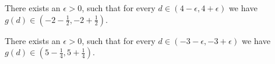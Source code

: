 \documentclass{ximera}
\begin{document}
\begin{exercise}
\begin{question}
\end{question}














\begin{question} 

There exists an $\epsilon > 0$, such that for every $d \in (4-\epsilon, 4+\epsilon)$ we have $g(d) \in \left( -2-\frac{1}{2}, -2+\frac{1}{2} \right)$.
\begin{multipleChoice}
\end{multipleChoice}


\end{question}















\begin{question} 

There exists an $\epsilon > 0$, such that for every $d \in (-3-\epsilon, -3+\epsilon)$ we have $g(d) \in \left( 5-\frac{1}{4}, 5+\frac{1}{4} \right)$.
\begin{multipleChoice}
\end{multipleChoice}


\end{question}











\end{exercise}
\end{document}
